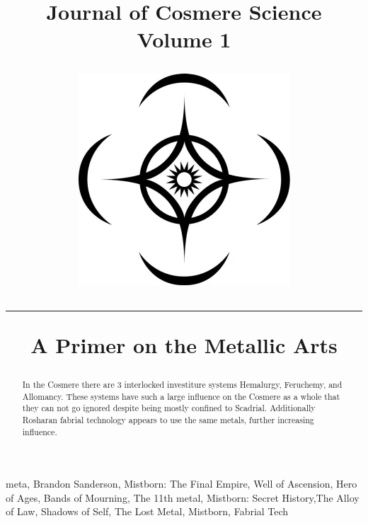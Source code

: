 \documentclass[conference]{IEEEtran}
\newcommand{\n}{\hfill\break}
\begin{document}
\makeatletter
\newlength{\logoheight}
\setlength{\logoheight}{50pt} %

    

\title{\parbox[c]{.75\linewidth}{{\selectfont\Huge{\textbf{Journal of Cosmere Science}}\\\huge{Volume 1}}}%
    \hfill%
    \raisebox{\dimexpr-.5\logoheight+.5ex\relax}%
    {\includegraphics[height=\logoheight]{images/cosmere_symbol.png}}\par%
    \vspace{15pt}%
    
    \hrule
    \n
    \textbf{A Primer on the Metallic Arts}}

\author{
}

\maketitle

\begin{abstract}
In the Cosmere there are 3 interlocked investiture systems Hemalurgy, Feruchemy, and Allomancy.  These systems have such a large influence on the Cosmere as a whole that they can not go ignored despite being mostly confined to Scadrial.  Additionally Rosharan fabrial technology appears to use the same metals, further increasing influence.
\end{abstract}

\begin{IEEEkeywords}
meta, Brandon Sanderson, Mistborn: The Final Empire, Well of Ascension, Hero of Ages, Bands of Mourning, The 11th metal, Mistborn: Secret History,The Alloy of Law, Shadows of Self, The Lost Metal, Mistborn, Fabrial Tech
\end{IEEEkeywords}
\n
\end{document}
